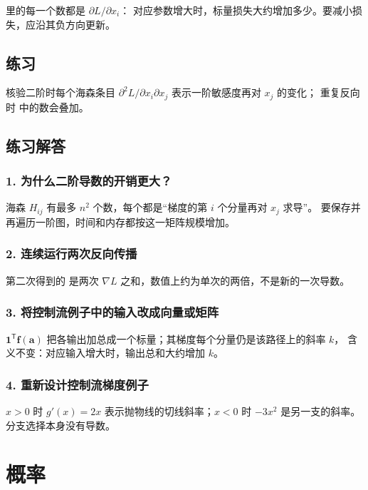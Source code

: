  里的每一个数都是 $\partial L/\partial x_i$：
对应参数增大时，标量损失大约增加多少。要减小损失，应沿其负方向更新。

\subsection{练习}

核验二阶时每个海森条目 $\partial^2 L/\partial x_i\partial x_j$ 表示一阶敏感度再对 $x_j$ 的变化；
重复反向时  中的数会叠加。

\subsection{练习解答}

\subsubsection{1. 为什么二阶导数的开销更大？}

海森 $H_{ij}$ 有最多 $n^2$ 个数，每个都是“梯度的第 $i$ 个分量再对 $x_j$ 求导”。
要保存并再遍历一阶图，时间和内存都按这一矩阵规模增加。

\subsubsection{2. 连续运行两次反向传播}

第二次得到的  是两次 $\nabla L$ 之和，数值上约为单次的两倍，不是新的一次导数。

\subsubsection{3. 将控制流例子中的输入改成向量或矩阵}

$\bm{1}^{\mathsf T}\bm{f}(\bm{a})$ 把各输出加总成一个标量；其梯度每个分量仍是该路径上的斜率 $k$，
含义不变：对应输入增大时，输出总和大约增加 $k$。

\subsubsection{4. 重新设计控制流梯度例子}

$x>0$ 时 $g'(x)=2x$ 表示抛物线的切线斜率；$x<0$ 时 $-3x^2$ 是另一支的斜率。
分支选择本身没有导数。

\section{概率}


